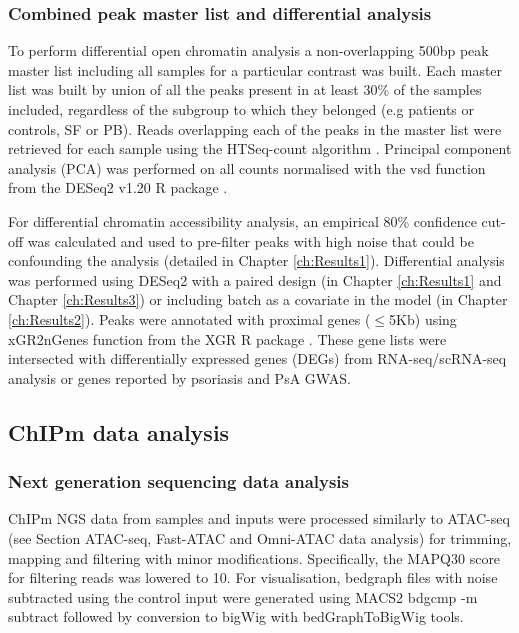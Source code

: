 \subsubsection{Combined peak master list and differential analysis}
To perform differential open chromatin analysis a non-overlapping 500bp peak master list including all samples for a particular contrast was built. Each master list was built by union of all the peaks present in at least 30\% of the samples included, regardless of the subgroup to which they belonged (e.g patients or controls, SF or PB).  Reads overlapping each of the peaks in the master list were retrieved for each sample using the HTSeq-count algorithm \parencite{Anders2015}. Principal component analysis (PCA) was performed on all counts normalised with the vsd function from the DESeq2 v1.20 R package \parencite{Love2014}.

For differential chromatin accessibility analysis, an empirical 80\% confidence cut-off was calculated and used to pre-filter peaks with high noise that could be confounding the analysis (detailed in Chapter \ref{ch:Results1}). Differential analysis was performed using DESeq2 with a paired design (in Chapter \ref{ch:Results1} and Chapter \ref{ch:Results3}) or including batch as a covariate in the model (in Chapter \ref{ch:Results2}). Peaks were annotated with proximal genes ($\leq$5Kb) using xGR2nGenes function from the XGR R package \parencite{Fang2016}. These gene lists were intersected with differentially expressed genes (DEGs) from RNA-seq/scRNA-seq analysis or genes reported by psoriasis and PsA GWAS.





\subsection{ChIPm data analysis}

\subsubsection{Next generation sequencing data analysis}
ChIPm NGS data from samples and inputs were processed similarly to ATAC-seq (see Section ATAC-seq, Fast-ATAC and Omni-ATAC data analysis) for trimming, mapping and filtering with minor modifications. Specifically, the MAPQ30 score for filtering reads was lowered to 10. For visualisation, bedgraph files with noise subtracted using the control input were generated using MACS2 bdgcmp -m subtract followed by conversion to bigWig with bedGraphToBigWig tools.

